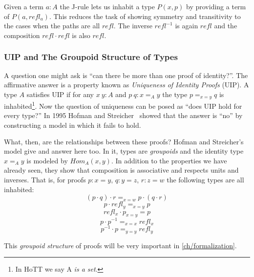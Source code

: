 Given a term $a:A$ the J-rule lets us inhabit a type $P(x,p)$ by providing a
term of $P(a, refl_a)$. This reduces the task of showing symmetry and
transitivity to the cases when the paths are all $refl$. The inverse $refl^{-1}$
is again $refl$ and the composition $refl \cdot refl$ is also $refl$.


\subsubsection{UIP and The Groupoid Structure of Types}

A question one might ask is ``can there be more than one proof of identity?''.
The affirmative answer is a property known as \emph{Uniqueness of Identity Proofs} (UIP). A
type $A$ satisfies UIP if for any $x~y : A$ and $p~q : x =_A y$ the type $p =_{x
= y} q$ is inhabited\footnote{In HoTT we say A \emph{is a set}.}. Now the
question of uniqueness can be posed as ``does UIP hold for every type?'' In 1995
Hofman and Streicher~\cite{Hofman1998} showed that the answer is ``no'' by
constructing a model in which it fails to hold.

What, then, are the relationships between these proofs? Hofman and Streicher's
model give and answer here too. In it, types are \emph{groupoids} and the
identity type $x =_A y$ is modeled by $Hom_A(x, y)$. In addition to the
properties we have already seen, they show that composition is associative and
respects units and inverses. That is, for proofs $p : x = y$, $q : y = z$, $r :
z = w$ the following types are all inhabited:
\[(p \cdot q) \cdot r =_{x = w} p \cdot (q \cdot r)\]
\[p \cdot refl_y =_{x = y} p\]
\[refl_x \cdot p_{x = y} = p\]
\[p \cdot p^{-1} =_{x = x} refl_x\]
\[p^{-1} \cdot p =_{y = y} refl_y\]

This \emph{groupoid structure} of proofs will be very important in \autoref{ch/formalization}.
